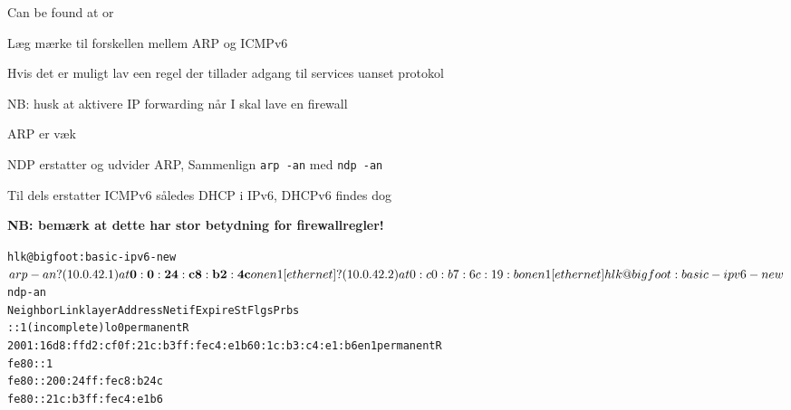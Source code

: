 \documentclass[Screen16to9,17pt]{foils}
\begin{document}
{\small Can be found at  or \\
}



\begin{list1}
\item Læg mærke til forskellen mellem ARP og ICMPv6
\item Hvis det er muligt lav een regel der tillader adgang til services uanset protokol
\item NB: husk at aktivere IP forwarding når I skal lave en firewall
\end{list1}




\begin{list1}
\item ARP er væk
\item NDP erstatter og udvider ARP, Sammenlign \verb+arp -an+ med \verb+ndp -an+
\item Til dels erstatter ICMPv6 således DHCP i IPv6, DHCPv6 findes dog
\item {\bf NB: bemærk at dette har stor betydning for firewallregler!}
\end{list1}


\begin{alltt}
\small
hlk@bigfoot:basic-ipv6-new$ arp -an
? (10.0.42.1) at{\bf 0:0:24:c8:b2:4c} on en1 [ethernet]
? (10.0.42.2) at 0:c0:b7:6c:19:b on en1 [ethernet]
hlk@bigfoot:basic-ipv6-new$ ndp -an
Neighbor                      Linklayer Address  Netif Expire    St Flgs Prbs
::1                           (incomplete)         lo0 permanent R
2001:16d8:ffd2:cf0f:21c:b3ff:fec4:e1b6 0:1c:b3:c4:e1:b6 en1 permanent R
fe80::1%lo0                   (incomplete)         lo0 permanent R
fe80::200:24ff:fec8:b24c%en1 {\bf 0:0:24:c8:b2:4c}      en1 8h54m51s  S  R
fe80::21c:b3ff:fec4:e1b6%en1  0:1c:b3:c4:e1:b6     en1 permanent R
\end{alltt}
\end{document}
